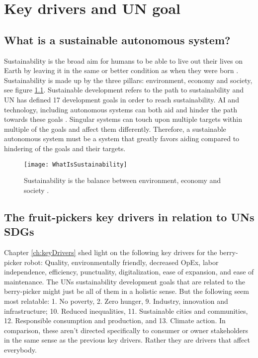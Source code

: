 \documentclass[%
oneside,    %
project,    %
nosummary   %
]{USN-MSc}
\begin{document}
\chapter{Key drivers and UN goal}
\label{ch:keyDriversUn}

\section{What is a sustainable autonomous system?}
Sustainability is the broad aim for humans to be able to live out their lives on Earth by leaving it in the same or better condition as when they were born \cite{enwiki:1113015553}. Sustainability is made up by the three pillars: environment, economy and society, see figure \ref{fig:whatIsSus}. Sustainable development refers to the path to sustainability and UN has defined 17 development goals in order to reach sustainability. AI and technology, including autonomous systems can both aid and hinder the path towards these goals \cite{vinuesa2020role}. Singular systems can touch upon multiple targets within multiple of the goals and affect them differently. Therefore, a sustainable autonomous system must be a system that greatly favors aiding compared to hindering of the goals and their targets.

\begin{figure}[!ht]
  \centering
  \texttt{[image: WhatIsSustainability]}
  \caption{Sustainability is the balance between environment, economy and society \cite{enwiki:1113015553}.}
  \label{fig:whatIsSus}
\end{figure}

\section{The fruit-pickers key drivers in relation to UNs SDGs}
Chapter \ref{ch:keyDrivers} shed light on the following key drivers for the berry-picker robot: Quality, environmentally friendly, decreased OpEx, labor independence, efficiency, punctuality, digitalization, ease of expansion, and ease of maintenance.
The UNs sustainability development goals that are related to the berry-picker might just be all of them in a holistic sense. But the following seem most relatable: 1. No poverty, 2. Zero hunger, 9. Industry, innovation and infrastructure; 10. Reduced inequalities, 11. Sustainable cities and communities, 12. Responsible consumption and production, and 13. Climate action.
In comparison, these aren't directed specifically to consumer or owner stakeholders in the same sense as the previous key drivers. Rather they are drivers that affect everybody.
\end{document}
